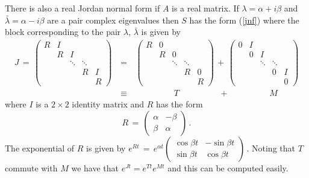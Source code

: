 \documentclass[12pt]{report}
\def\eqref#1{(\ref{#1})}
\begin{document}
There is also a real Jordan normal form if $A$ is a real matrix.  If
$\lambda=\alpha + i\beta$ and ${\bar \lambda}=\alpha -i \beta$ are a
pair complex eigenvalues then $S$ has the form \eqref{jnf} where the
block corresponding to the pair $\lambda$,  ${\bar \lambda}$ is given by
\begin{eqnarray}\label{clamj}
J \,=\, \left( \begin{array}{ccccc} 
R &  I       &         &          &           \\ 
          &R &     I   &          &        \\
          &          &  \ddots & \ddots  &     \\
          &          &         &R  & I       \\
          &          &         &          & R      
\end{array}
\right)    \,&=&\,   \left( \begin{array}{ccccc} 
R &  0       &         &          &           \\ 
          &R &   0   &          &        \\
          &          &  \ddots & \ddots  &     \\
          &          &         &R  & 0       \\
          &          &         &          & R      
\end{array}
\right) \,+\,  \left( \begin{array}{ccccc} 
0 &  I       &         &          &           \\ 
          &0 &     I   &          &        \\
          &          &  \ddots & \ddots  &     \\
          &          &         &0  & I       \\
          &          &         &          & 0      
\end{array}
\right)  \nonumber \\
&\equiv&  \hspace{2cm}T \hspace{2cm} + \hspace{2cm}  M  \nonumber 
 \end{eqnarray}  
where $I$ is a $2\times2$ identity matrix and $R$ has the form 
\begin{equation}
R \,=\, \left( \begin{array}{cc} 
\alpha  & -\beta   \\ 
 \beta    & \alpha 
 \end{array}
\right) \,.
\end{equation}
The exponential of $R$ is given by  $
e^{Rt} \,=\, e^{\alpha t} \left( \begin{array}{cc} 
\cos \beta t  & -\sin \beta t   \\ 
 \sin \beta t    & \cos \beta t 
 \end{array}
\right) \,.
$ 
Noting that $T$ commute with $M$ we have that $e^{Jt} = e^{Tt} e^{Mt}$ and this can be computed easily.
\end{document}
